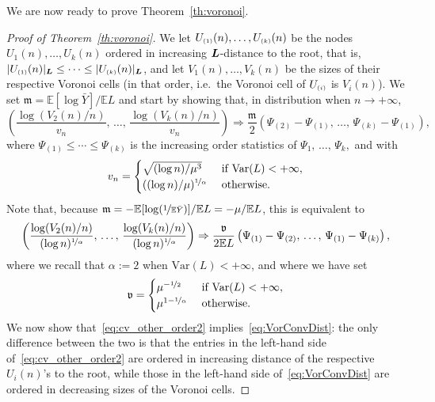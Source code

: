 \documentclass[10pt]{amsart}
\theoremstyle{definition}\newtheorem{defi}[theo]{Definition}\newtheorem{rema}[theo]{Remark}\newtheorem{exam}[theo]{Example}\newtheorem{exem}[theo]{Example}\newtheorem{nota}[theo]{Notation}
\newcommand{\bs}{\ensuremath{\boldsymbol}}
\newcommand{\sss}{\ensuremath{\scriptscriptstyle}}
\newcommand{\bbE}{\mathbb{E}}
\newcommand{\Var}{\mathrm{Var}}
\newcommand{\frkv}{\mathfrak{v}}
\newcommand{\frkm}{\mathfrak{m}}
\begin{document}
We are now ready to prove Theorem~\ref{th:voronoi}.
\begin{proof}[Proof of Theorem~\ref{th:voronoi}]
We let $U_{\sss (1)}(n), \ldots, U_{\sss (k)}(n)$ be the nodes $U_1(n), \ldots, U_k(n)$ ordered in increasing $\bs L$-distance to the root, that is, $|U_{\sss (1)}(n)|_{\bs L}\leq \cdots\leq |U_{\sss (k)}(n)|_{\bs L}$, and let $V_1(n), \ldots, V_k(n)$ be the sizes of their respective Voronoi cells (in that order, i.e.\ the Voronoi cell of $U_{\sss (i)}$ is $V_i(n)$). We set $\frkm = \bbE[\log \bar Y]/\bbE L$ and start by showing that, in distribution when $n\to+\infty$,
\begin{equation}\label{eq:cv_other_order}
\left(\frac{\log (V_2(n)/n)}{v_n},\,\ldots,\,\frac{\log (V_k(n)/n)}{v_n}\right)
\Rightarrow \frac{\frkm}{2} \left(\Psi_{(2)}-\Psi_{(1)}, \,\ldots,\, \Psi_{(k)}-\Psi_{(1)}\right),
\end{equation}
where $\Psi_{(1)}\leq \cdots\leq \Psi_{(k)}$ is the increasing order statistics of $\Psi_1, \,\ldots,\, \Psi_k,$ and with
\begin{equation}\label{eq:def_vn}
v_n =
\begin{cases}
\sqrt{(\log n)/\mu^3} &\text{ if }\Var(L)<+\infty,\\
((\log n)/\mu)^{\nicefrac1\alpha}&\text{ otherwise}.
\end{cases}
\end{equation}
Note that, because $\frkm = -\bbE[\log(\nicefrac1{\bbE\bar Y})]/\bbE L = -\mu/\bbE L$, this is equivalent to
\begin{equation}\label{eq:cv_other_order2}
\left(\frac{\log (V_2(n)/n)}{(\log n)^{\nicefrac1\alpha}}, \,\ldots,\,\frac{\log (V_k(n)/n)}{(\log n)^{\nicefrac1\alpha}}\right)
\Rightarrow \frac{\frkv}{2\bbE L} \left(\Psi_{(1)}-\Psi_{(2)}, \,\ldots,\, \Psi_{(1)}-\Psi_{(k)}\right),
\end{equation}
where we recall that $\alpha :=2$ when $\Var(L)<+\infty$, and where we have set
\[
\frkv =
\begin{cases}
\mu^{-\nicefrac12} & \text{ if }\Var(L)<+\infty,\\
\mu^{1-\nicefrac1\alpha} &\text{ otherwise.}
\end{cases}
\]
We now show that~\eqref{eq:cv_other_order2} implies~\eqref{eq:VorConvDist}: the only difference between the two is that the entries in the left-hand side of~\eqref{eq:cv_other_order2} are ordered in increasing distance of the respective $U_i(n)$'s to the root, while those in the left-hand side of~\eqref{eq:VorConvDist} are ordered in decreasing sizes of the Voronoi cells.


\end{proof}
\end{document}

